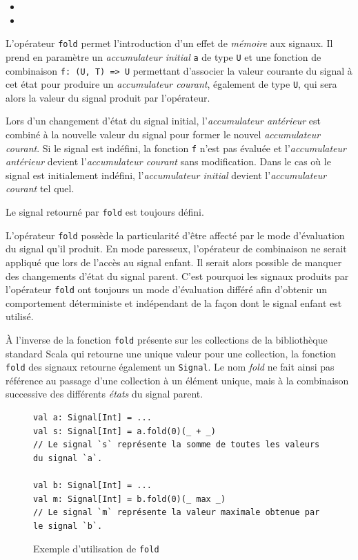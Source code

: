 \begin{itemize}
	\item {}
	\item {}
\end{itemize}

L'opérateur \texttt{fold} permet l'introduction d'un effet de \emph{mémoire} aux signaux. Il prend en paramètre un \emph{accumulateur initial} \texttt{a} de type \texttt{U} et une fonction de combinaison \texttt{f: (U, T) => U} permettant d'associer la valeur courante du signal à cet état pour produire un \emph{accumulateur courant}, également de type \texttt{U}, qui sera alors la valeur du signal produit par l'opérateur.

Lors d'un changement d'état du signal initial, l'\emph{accumulateur antérieur} est combiné à la nouvelle valeur du signal pour former le nouvel \emph{accumulateur courant}. Si le signal est indéfini, la fonction \texttt{f} n'est pas évaluée et l'\emph{accumulateur antérieur} devient l'\emph{accumulateur courant} sans modification. Dans le cas où le signal est initialement indéfini, l'\emph{accumulateur initial} devient l'\emph{accumulateur courant} tel quel.

Le signal retourné par \texttt{fold} est toujours défini.

L'opérateur \texttt{fold} possède la particularité d'être affecté par le mode d'évaluation du signal qu'il produit. En mode paresseux, l'opérateur de combinaison ne serait appliqué que lors de l'accès au signal enfant. Il serait alors possible de manquer des changements d'état du signal parent. C'est pourquoi les signaux produits par l'opérateur \texttt{fold} ont toujours un mode d'évaluation différé afin d'obtenir un comportement déterministe et indépendant de la façon dont le signal enfant est utilisé.

À l'inverse de la fonction \texttt{fold} présente sur les collections de la bibliothèque standard Scala qui retourne une unique valeur pour une collection, la fonction \texttt{fold} des signaux retourne également un \texttt{Signal}. Le nom \emph{fold} ne fait ainsi pas référence au passage d'une collection à un élément unique, mais à la combinaison successive des différents \emph{états} du signal parent.

\begin{figure}[h]
	\begin{lstlisting}
val a: Signal[Int] = ...
val s: Signal[Int] = a.fold(0)(_ + _)
// Le signal `s` représente la somme de toutes les valeurs du signal `a`.

val b: Signal[Int] = ...
val m: Signal[Int] = b.fold(0)(_ max _)
// Le signal `m` représente la valeur maximale obtenue par le signal `b`.
	\end{lstlisting}
	\caption{Exemple d'utilisation de \texttt{fold}}
\end{figure}

